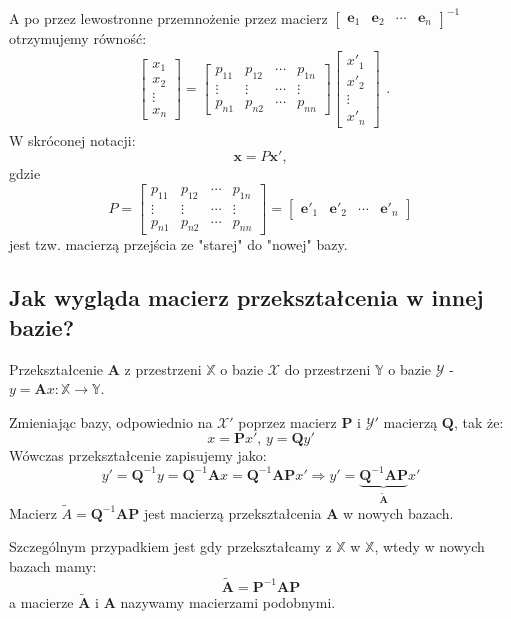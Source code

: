 \documentclass{article}
\begin{document}
A po przez lewostronne przemnożenie przez macierz $\begin{bmatrix} \mathbf{e}_{1} & \mathbf{e}_{2} & \cdots & \mathbf{e}_{n} \end{bmatrix}^{-1}$ otrzymujemy równość:
$$
\begin{array}{l}
\begin{bmatrix} x_{1} \\ x_{2} \\ \vdots \\ x_{n} \end{bmatrix} 
=
\begin{bmatrix}
    p_{11} & p_{12} & \cdots & p_{1n}\\
    \vdots & \vdots & \cdots & \vdots\\
    p_{n1} & p_{n2} & \cdots & p_{nn}
\end{bmatrix}
\begin{bmatrix} x'_{1} \\ x'_{2} \\ \vdots \\ x'_{n} \end{bmatrix} 
\end{array}.
$$
W skróconej notacji:
$$
\mathbf{x} = P\mathbf{x}',
$$
gdzie 
$$
P
=
\begin{bmatrix}
    p_{11} & p_{12} & \cdots & p_{1n}\\
    \vdots & \vdots & \cdots & \vdots\\
    p_{n1} & p_{n2} & \cdots & p_{nn}
\end{bmatrix}
=
\begin{bmatrix}
    \mathbf{e}'_{1} & \mathbf{e}'_{2} & \cdots & \mathbf{e}'_{n}
\end{bmatrix}
$$
jest tzw. macierzą przejścia ze "starej" do "nowej" bazy.

\subsection*{Jak wygląda macierz przekształcenia w innej bazie?}
Przekształcenie $\mathbf{A}$ z przestrzeni $\mathbb{X}$ o bazie $\mathcal{X}$ do przestrzeni $\mathbb{Y}$ o bazie $\mathcal{Y}$ - $y = \mathbf{A}x: \mathbb{X} \rightarrow \mathbb{Y}$.

Zmieniając bazy, odpowiednio na $\mathcal{X}'$ poprzez macierz $\mathbf{P}$ i $\mathcal{Y}'$ macierzą $\mathbf{Q}$, tak że:
$$
    x = \mathbf{P}x',\,y = \mathbf{Q}y'
$$
Wówczas przekształcenie zapisujemy jako:
$$
    y' = \mathbf{Q}^{-1}y = \mathbf{Q}^{-1}\mathbf{A}x = \mathbf{Q}^{-1}\mathbf{A}\mathbf{P}x' \Rightarrow y'= \underbrace{\mathbf{Q}^{-1}\mathbf{A}\mathbf{P}}_{\tilde{\mathbf{A}}}x'
$$
Macierz $\tilde{A} = \mathbf{Q}^{-1}\mathbf{A}\mathbf{P}$ jest macierzą przekształcenia $\mathbf{A}$ w nowych bazach.

Szczególnym przypadkiem jest gdy przekształcamy z $\mathbb{X}$ w $\mathbb{X}$, wtedy w nowych bazach mamy:
$$
    \tilde{\mathbf{A}} = \mathbf{P}^{-1}\mathbf{A}\mathbf{P}
$$
a macierze $\tilde{\mathbf{A}}$ i $\mathbf{A}$ nazywamy macierzami podobnymi.
\end{document}
